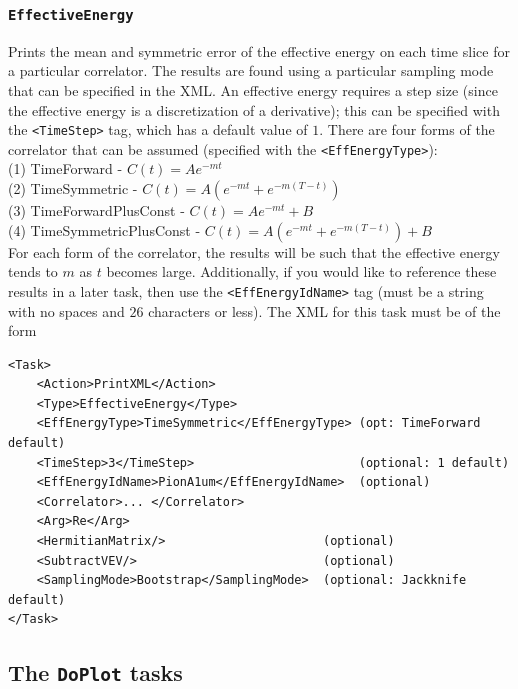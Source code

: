 \documentclass[12pt]{article}
\newcommand{\vb}{\texttt}
\begin{document}
\subsubsection{\vb{EffectiveEnergy}}
Prints the mean and symmetric error of
the effective energy on each time slice for a
particular correlator. The results are found using a particular sampling mode
that can be specified in the XML.
An effective energy requires a step size (since the effective energy
is a discretization of a derivative); this can be specified with
the \vb{<TimeStep>} tag, which has a default value of $1$.
There are four forms of the correlator that
can be assumed (specified with the \vb{<EffEnergyType>}): \\
\hspace*{15pt} (1) TimeForward - $C(t) = A e^{-m t}$ \\
\hspace*{15pt} (2) TimeSymmetric - $C(t) = A ( e^{-m t} + e^{-m (T-t)})$ \\
\hspace*{15pt} (3) TimeForwardPlusConst - $C(t) = A e^{-m t} + B$ \\
\hspace*{15pt} (4) TimeSymmetricPlusConst - $C(t) = A ( e^{-m t} + e^{-m (T-t)}) + B$ \\
For each form of the correlator, the results will be such that
the effective energy tends to $m$ as $t$ becomes large.
Additionally, if you would like to reference these results in a later task, then
use the \vb{<EffEnergyIdName>} tag (must be a string with no spaces and $26$ characters
or less). The XML for this task must be of the form
\begin{verbatim}
<Task>
    <Action>PrintXML</Action>
    <Type>EffectiveEnergy</Type>
    <EffEnergyType>TimeSymmetric</EffEnergyType> (opt: TimeForward default)
    <TimeStep>3</TimeStep>                       (optional: 1 default)
    <EffEnergyIdName>PionA1um</EffEnergyIdName>  (optional)
    <Correlator>... </Correlator>
    <Arg>Re</Arg>
    <HermitianMatrix/>                      (optional)
    <SubtractVEV/>                          (optional)
    <SamplingMode>Bootstrap</SamplingMode>  (optional: Jackknife default)
</Task>
\end{verbatim}

\subsection{The \vb{DoPlot} tasks}
\end{document}
